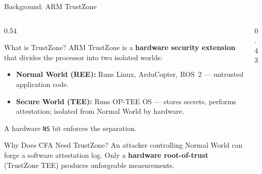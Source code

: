 \documentclass[aspectratio=169, 10pt]{beamer}
\begin{document}
\begin{frame}{Background: ARM TrustZone}
    \begin{columns}[T]
        \begin{column}{0.54\textwidth}
            \begin{defbox}{What is TrustZone?}
                \scriptsize ARM TrustZone is a \textbf{hardware security extension} that
                divides the processor into two isolated worlds:
                \begin{itemize}\scriptsize
                    \item \textbf{Normal World (REE):} Runs Linux, ArduCopter,
                          ROS~2 --- untrusted application code.
                    \item \textbf{Secure World (TEE):} Runs OP-TEE OS ---
                          stores secrets, performs attestation; isolated
                          from Normal World by hardware.
                \end{itemize}
                A hardware \texttt{NS} bit enforces the separation.
            \end{defbox}
            \vspace{3pt}
            \begin{warnbox}{Why Does CFA Need TrustZone?}
                \scriptsize An attacker controlling Normal World can forge a software
                attestation log. Only a \textbf{hardware root-of-trust}
                (TrustZone TEE) produces unforgeable measurements.
            \end{warnbox}
        \end{column}
        \begin{column}{0.43\textwidth}
            \begin{center}
\end{center}
\end{column}
\end{columns}
\end{frame}
\end{document}
